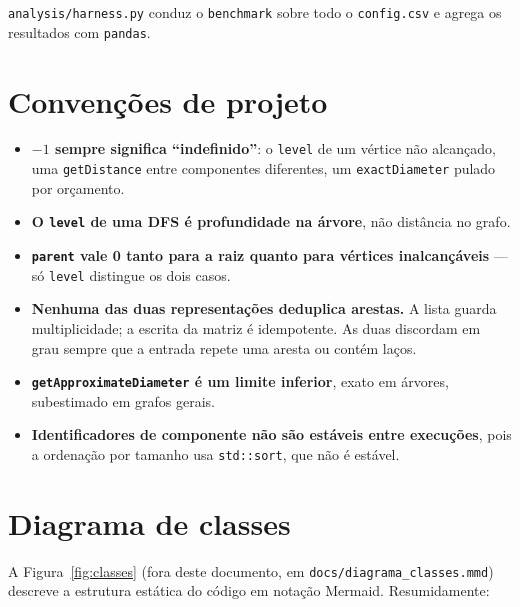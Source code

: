 \documentclass[a4paper,11pt]{article}
\begin{document}
\texttt{analysis/harness.py} conduz o \texttt{benchmark} sobre todo o
\texttt{config.csv} e agrega os resultados com \texttt{pandas}.

\section{Convenções de projeto}

\begin{itemize}
    \item \textbf{$-1$ sempre significa ``indefinido''}: o \texttt{level}
    de um vértice não alcançado, uma \texttt{getDistance} entre
    componentes diferentes, um \texttt{exactDiameter} pulado por
    orçamento.
    \item \textbf{O \texttt{level} de uma DFS é profundidade na árvore},
    não distância no grafo.
    \item \textbf{\texttt{parent} vale 0 tanto para a raiz quanto para
    vértices inalcançáveis} --- só \texttt{level} distingue os dois
    casos.
    \item \textbf{Nenhuma das duas representações deduplica arestas.} A
    lista guarda multiplicidade; a escrita da matriz é idempotente. As
    duas discordam em grau sempre que a entrada repete uma aresta ou
    contém laços.
    \item \textbf{\texttt{getApproximateDiameter} é um limite inferior},
    exato em árvores, subestimado em grafos gerais.
    \item \textbf{Identificadores de componente não são estáveis entre
    execuções}, pois a ordenação por tamanho usa \texttt{std::sort}, que
    não é estável.
\end{itemize}

\section{Diagrama de classes}

A Figura~\ref{fig:classes} (fora deste documento, em
\texttt{docs/diagrama\_classes.mmd}) descreve a estrutura estática do
código em notação Mermaid. Resumidamente:
\end{document}
